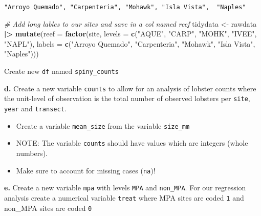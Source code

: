 \documentclass[
]{article}
\newenvironment{Shaded}{\begin{snugshade}}{\end{snugshade}}
\newcommand{\AttributeTok}[1]{\textcolor[rgb]{0.13,0.29,0.53}{#1}}
\newcommand{\CommentTok}[1]{\textcolor[rgb]{0.56,0.35,0.01}{\textit{#1}}}
\newcommand{\FunctionTok}[1]{\textcolor[rgb]{0.13,0.29,0.53}{\textbf{#1}}}
\newcommand{\NormalTok}[1]{#1}
\newcommand{\OtherTok}[1]{\textcolor[rgb]{0.56,0.35,0.01}{#1}}
\newcommand{\SpecialCharTok}[1]{\textcolor[rgb]{0.81,0.36,0.00}{\textbf{#1}}}
\newcommand{\StringTok}[1]{\textcolor[rgb]{0.31,0.60,0.02}{#1}}
\providecommand{\tightlist}{%
  \setlength{\itemsep}{0pt}\setlength{\parskip}{0pt}}
\begin{document}
\begin{verbatim}
"Arroyo Quemado", "Carpenteria", "Mohawk", "Isla Vista",  "Naples"
\end{verbatim}

\begin{Shaded}
\begin{Highlighting}[]
\CommentTok{\# Add long lables to our sites and save in a col named reef}
\NormalTok{tidydata }\OtherTok{\textless{}{-}}\NormalTok{ rawdata }\SpecialCharTok{|\textgreater{}}
    \FunctionTok{mutate}\NormalTok{(}\AttributeTok{reef =} \FunctionTok{factor}\NormalTok{(site, }
                         \AttributeTok{levels =} \FunctionTok{c}\NormalTok{(}\StringTok{"AQUE"}\NormalTok{, }\StringTok{"CARP"}\NormalTok{, }\StringTok{"MOHK"}\NormalTok{, }\StringTok{"IVEE"}\NormalTok{, }\StringTok{"NAPL"}\NormalTok{), }
                         \AttributeTok{labels =} \FunctionTok{c}\NormalTok{(}\StringTok{"Arroyo Quemado"}\NormalTok{, }\StringTok{"Carpenteria"}\NormalTok{, }\StringTok{"Mohawk"}\NormalTok{, }
                                    \StringTok{"Isla Vista"}\NormalTok{,  }\StringTok{"Naples"}\NormalTok{)))}
\end{Highlighting}
\end{Shaded}

Create new \texttt{df} named \texttt{spiny\_counts}

\textbf{d.} Create a new variable \texttt{counts} to allow for an
analysis of lobster counts where the unit-level of observation is the
total number of observed lobsters per \texttt{site}, \texttt{year} and
\texttt{transect}.

\begin{itemize}
\tightlist
\item
  Create a variable \texttt{mean\_size} from the variable
  \texttt{size\_mm}
\item
  NOTE: The variable \texttt{counts} should have values which are
  integers (whole numbers).
\item
  Make sure to account for missing cases (\texttt{na})!
\end{itemize}

\textbf{e.} Create a new variable \texttt{mpa} with levels \texttt{MPA}
and \texttt{non\_MPA}. For our regression analysis create a numerical
variable \texttt{treat} where MPA sites are coded \texttt{1} and
non\_MPA sites are coded \texttt{0}
\end{document}
